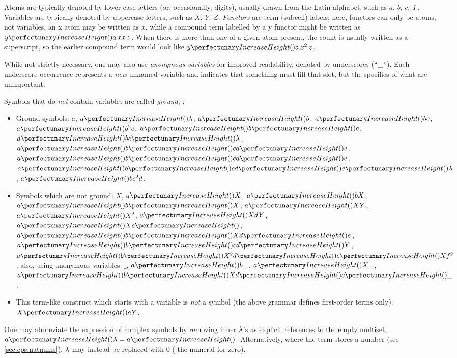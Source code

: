 Atoms are typically denoted by lower case letters (or, occasionally, digits), usually drawn from the Latin alphabet, 
such as \(a\), \(b\), \(c\), \(\mathit{1}\). 
Variables are typically denoted by uppercase letters, 
such as \(X\), \(Y\), \(Z\).
\emph{Functors} are term (subcell) labels; here, functors can only be atoms, not variables.  
\Eg{} an x atom may be written as \(x\), while a compound term labelled by a y functor might be written as \(\cpfunc{y}{a \, xx \, z}\).  When there is more than one of a given atom present, the count is usually written as a superscript, so the earlier compound term would look like \(\cpfunc{y}{a \, x^2 \, z}\).

While not strictly necessary, one may also use \emph{anonymous variables} for improved readability, denoted by underscores (``\(\_\)'').
Each underscore occurrence represents a \emph{new} unnamed variable
and indicates that something must fill that slot, but the specifics of what are unimportant.

Symbols that do \emph{not} contain variables are called \emph{ground}, \eg{}:
\begin{itemize}
\item Ground symbols:
\(a\), \(\cpfunc{a}{\cpempty}\), \(\cpfunc{a}{b}\), \(\cpfunc{a}{b c}\), \(\cpfunc{a}{b^2 c}\), \(\cpfunc{a}{\cpfunc{b}{c}}\), \(\cpfunc{a}{b\cpfunc{c}{\cpempty}}\), \(\cpfunc{a}{\cpfunc{b}{c}\cpfunc{d}{e}}\), \(\cpfunc{a}{\cpfunc{b}{c}\cpfunc{d}{e}}\), \(\cpfunc{a}{\cpfunc{b}{c}\cpfunc{d}{\cpfunc{e}{\cpempty}}}\), \(\cpfunc{a}{bc^2 d}\).

\smallskip
\item Symbols which are not ground:
\(X\), \(\cpfunc{a}{X}\), \(\cpfunc{a}{bX}\), \(\cpfunc{a}{\cpfunc{b}{X}}\), \(\cpfunc{a}{XY}\), \(\cpfunc{a}{X^2}\), \(\cpfunc{a}{XdY}\),  \(\cpfunc{a}{X\cpfunc{c}{}}\), \(\cpfunc{a}{\cpfunc{b}{X}\cpfunc{d}{e}}\), \(\cpfunc{a}{\cpfunc{b}{c}\cpfunc{d}{Y}}\), \(\cpfunc{a}{\cpfunc{b}{X^2}\cpfunc{d}{\cpfunc{e}{Xf^2}}}\);
also, using anonymous variables: \(\_\), \(\cpfunc{a}{b\_}\), \(\cpfunc{a}{X\_}\), \(\cpfunc{a}{\cpfunc{b}{X}\cpfunc{d}{\cpfunc{e}{\_}}}\).

\smallskip
\item This term-like construct which starts with a variable is \emph{not} a symbol (the above grammar defines first-order terms only):
\(\cpfunc{X}{a Y}\).
\end{itemize}

One may abbreviate the expression of complex symbols 
by removing inner \(\lambda\)'s as explicit references to the empty multiset, 
\eg{}~\(\cpfunc{a}{\cpempty} = \cpfunc{a}{}\).  Alternatively, where the term stores a number (see \vref{sec:cps:natnums}), \(\lambda\) may instead be replaced with \(0\) (\ie{} the numeral for zero).

